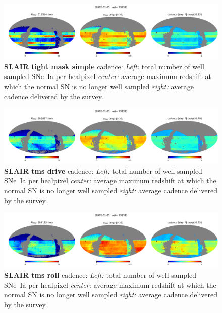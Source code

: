 \begin{figure}[h!]
  \begin{center}
    \includegraphics[width=\linewidth]{Figures/tight_mask_simple_10yrs_64_maps.png}
    \caption{{\bf SLAIR tight mask simple} cadence: {\em Left:} total number of well
      sampled SNe~Ia per healpixel {\em center:} average maximum
      redshift at which the normal SN is no longer well sampled {\em
        right:} average cadence delivered by the survey.}
  \end{center}
\end{figure}

\begin{figure}[h!]
  \begin{center}
    \includegraphics[width=\linewidth]{Figures/tms_drive_10yrs_64_maps.png}
    \caption{{\bf SLAIR tms drive} cadence: {\em Left:} total number of well
      sampled SNe~Ia per healpixel {\em center:} average maximum
      redshift at which the normal SN is no longer well sampled {\em
        right:} average cadence delivered by the survey.}
  \end{center}
\end{figure}

\begin{figure}[h!]
  \begin{center}
    \includegraphics[width=\linewidth]{Figures/tms_roll_10yrs_64_maps.png}
    \caption{{\bf SLAIR tms roll} cadence: {\em Left:} total number of well
      sampled SNe~Ia per healpixel {\em center:} average maximum
      redshift at which the normal SN is no longer well sampled {\em
        right:} average cadence delivered by the survey.}
  \end{center}
\end{figure}




